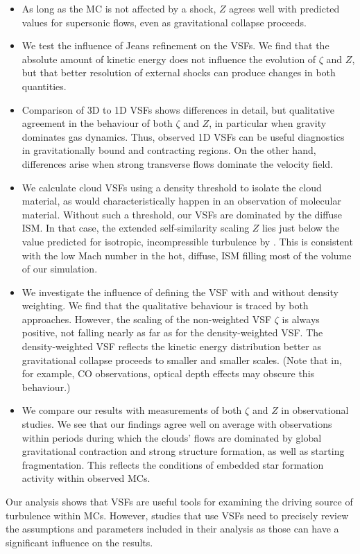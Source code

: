 \begin{itemize}
	\item As long as the MC is not affected by a shock, $Z$ agrees well with predicted values for supersonic flows, even as gravitational collapse proceeds.
	\item We test the influence of Jeans refinement on the VSFs. We find that the absolute amount of kinetic energy does not influence the evolution of $\zeta$ and $Z$, but that better resolution of external shocks can produce changes in both quantities.
	\item Comparison of 3D to 1D VSFs shows differences in detail, but qualitative agreement in the behaviour of both $\zeta$ and $Z$, in particular when gravity dominates gas dynamics. Thus, observed 1D VSFs can be useful diagnostics in gravitationally bound and contracting regions. On the other hand, differences arise when strong transverse flows dominate the velocity field. 
	\item We calculate cloud VSFs using a density threshold to isolate the cloud material, as would characteristically happen in an observation of molecular material. Without such a threshold, our VSFs are dominated by the diffuse ISM. In that case, the extended self-similarity scaling $Z$ lies just below the value predicted for isotropic, incompressible turbulence by \citet{She1994}. This is consistent with the low Mach number in the hot, diffuse, ISM filling most of the volume of our simulation.
	\item We investigate the influence of defining the VSF with and without density weighting. We find that the qualitative behaviour is traced by both approaches. However, the scaling of the non-weighted VSF $\zeta$ is always positive, not falling nearly as far as for the density-weighted VSF. The density-weighted VSF reflects the kinetic energy distribution better as gravitational collapse proceeds to smaller and smaller scales. (Note that in, for example, CO observations, optical depth effects may obscure this behaviour.) 
	\item We compare our results with measurements of both $\zeta$ and $Z$ in observational studies. We see that our findings agree well on average with observations within periods during which the clouds' flows are dominated by global gravitational contraction and strong structure formation, as well as starting fragmentation. This reflects the conditions of embedded star formation activity within observed MCs.
\end{itemize}

Our analysis shows that VSFs are useful tools for examining the driving source of turbulence within MCs.
However, studies that use VSFs need to precisely review the assumptions and parameters included in their analysis as those can have a significant influence on the results.

